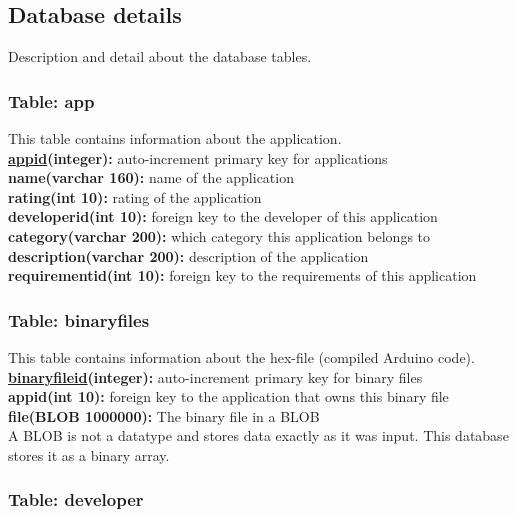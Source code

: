 	\subsection{Database details}

		Description and detail about the database tables.

		\subsubsection{Table: app}

			This table contains information about the application.\\

			{\bf \underline{appid}(integer):} auto-increment primary key for applications  \\
			\textbf{name(varchar 160):} name of the application \\
			\textbf{rating(int 10):} rating of the application \\
			\textbf{developerid(int 10):} foreign key to the developer of this application \\
			\textbf{category(varchar 200):} which category this application belongs to \\
			\textbf{description(varchar 200):} description of the application \\
			\textbf{requirementid(int 10):} foreign key to the requirements of this application \\

		\subsubsection{Table: binaryfiles}

			This table contains information about the hex-file (compiled Arduino code). \\
			{\bf \underline{binaryfileid}(integer):} auto-increment primary key for binary files \\
			\textbf{appid(int 10):} foreign key to the application that owns this binary file \\
			\textbf{file(BLOB 1000000):} The binary file in a BLOB \\

			A BLOB is not a datatype and stores data exactly as it was input. This database stores it as a binary array.

		\subsubsection{Table: developer}

